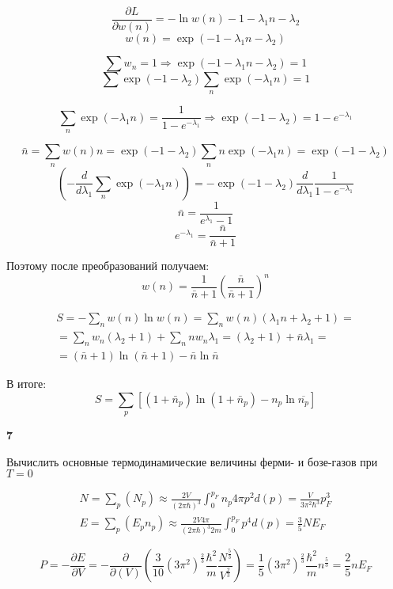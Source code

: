 \documentclass[a4paper,12pt]{article} %
\newcommand{\parder}[2]{\frac{\partial {#1}}{\partial {#2}}}
\begin{document}
\begin{task}
$$
\frac{\partial L}{\partial w(n)}=-\ln w(n)-1 -\lambda_1 n - \lambda_2
$$
$$
w(n)=\exp\left(-1-\lambda_{1} n-\lambda_{2}\right)
$$

$$
\sum w_{n}=1 \Rightarrow \exp \left(-1-\lambda_{1} n-\lambda_{2}\right)=1
$$
$$\sum
\exp \left(-1-\lambda_{2}\right) \sum_{n} \exp (-\lambda_1 n)=1
$$

$$
\sum_{n} \operatorname{exp}\left(-\lambda_{1} n\right)=
\frac{1}{1-e^{-\lambda_{1}}} \Rightarrow \operatorname{exp}\left(-1-\lambda_{2}\right)=1-e^{-\lambda_{1}}
$$


$$
\bar{n}=\sum_{n} w(n) n=\exp \left(-1-\lambda_{2}\right) \sum_{n} n 
\exp \left(-\lambda_{1} n\right)=\exp \left(-1-\lambda_{2}\right)
$$
\[ \left(-\frac{d}{d \lambda_1} \sum_{n} \exp \left(-\lambda_{1} n\right)\right)=-\exp \left(-1-\lambda_{2}\right) \frac{d}{d \lambda_{1}} \frac{1}{1-e^{-\lambda_{1}}} \]
%
\[ \bar{n}=\frac{1}{e^{\lambda_{1}}-1 } \]
\[ e^{-\lambda_{1}}=\frac{\bar{n}}{\bar{n}+1} \]




Поэтому после преобразований получаем:
$$
w(n)=\frac{1}{\bar{n}+1}
\left(\frac{\bar{n}}{\bar{n}+1}\right)^{n}
$$


\begin{multline}
S=-\sum_{n} w(n) \ln w(n)=\sum_{n} w(n)\left(\lambda_{1} n+\lambda_{2}+1\right) =\\
= \sum_{n} w_{n}\left(\lambda_{2}+1\right)+\sum_{n} n w_{n} \lambda_{1}=\left(\lambda_{2}+1\right)+\bar{n} \lambda_{1}=\\
=(\bar{n}+1) \ln (\bar{n}+1)-\bar{n} \ln \bar{n}
\end{multline}

В итоге:
$$
S=\sum_{p}\left[\left(1+\bar{n}_{p}\right) \ln \left(1+\bar{n}_{p}\right)-n_{p} \ln \overline{n_{p}}\right]
$$



\end{task}


\begin{task}\textbf{7}

Вычислить основные термодинамические величины ферми- и бозе-газов при $T=0$

\[ \begin{array}{c}
	N=\sum_{p}\left(N_{p}\right) \approx \frac{2 V}{(2 \pi \hbar)^{3}} \int_{0}^{p_{F}} n_{p} 4 \pi p^{2} d(p)=\frac{V}{3 \pi^{2} \hbar^{3}} p_{F}^{3} \\
	E=\sum_{p}\left(E_{p} n_{p}\right) \approx \frac{2 V 4 \pi}{(2 \pi \hbar)^{3} 2 m} \int_{0}^{p_{F}} p^{4} d(p)=\frac{3}{5} N E_{F} 
\end{array} \]

\[ 	P=-\parder{E}{V}=-\frac{\partial}{\partial(V)}\left(\frac{3}{10}\left(3 \pi^{2}\right)^{\frac{2}{3}} \frac{\hbar^{2}}{m} \frac{N^{\frac{5}{3}}}{V^{\frac{2}{3}}}\right)=\frac{1}{5}\left(3 \pi^{2}\right)^{\frac{2}{3}} \frac{\hbar^{2}}{m} n^{\frac{5}{3}}=\frac{2}{5} n E_{F} \]




\end{task}
\end{document}
